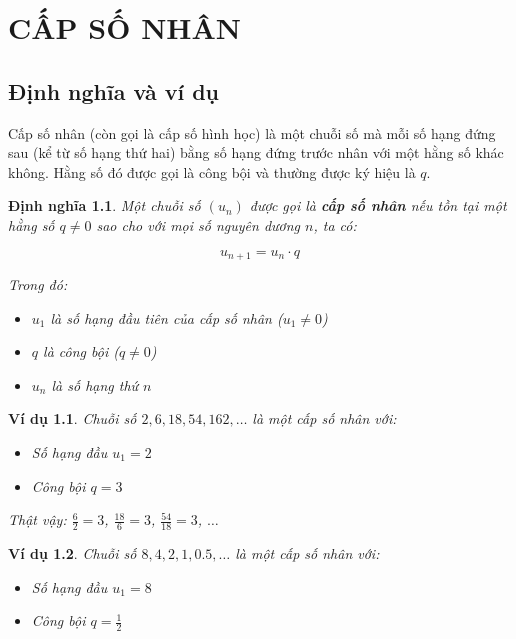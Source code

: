 \documentclass[12pt,a4paper]{report}
\newtheorem{definition}{Định nghĩa}[section]
\newtheorem{example}{Ví dụ}[section]
\begin{document}

\chapter{CẤP SỐ NHÂN}

\section{Định nghĩa và ví dụ}

Cấp số nhân (còn gọi là cấp số hình học) là một chuỗi số mà mỗi số hạng đứng sau (kể từ số hạng thứ hai) bằng số hạng đứng trước nhân với một hằng số khác không. Hằng số đó được gọi là công bội và thường được ký hiệu là $q$.

\begin{definition}
    Một chuỗi số $(u_n)$ được gọi là \textbf{cấp số nhân} nếu tồn tại một hằng số $q \neq 0$ sao cho với mọi số nguyên dương $n$, ta có:
    
    \[
        u_{n+1} = u_n \cdot q
    \]
    
    Trong đó:
    \begin{itemize}[label=\textbullet]
        \item $u_1$ là số hạng đầu tiên của cấp số nhân ($u_1 \neq 0$)
        \item $q$ là công bội ($q \neq 0$)
        \item $u_n$ là số hạng thứ $n$
    \end{itemize}
\end{definition}

\begin{example}
    Chuỗi số $2, 6, 18, 54, 162, \dots$ là một cấp số nhân với:
    
    \begin{itemize}[label=\textbullet]
        \item Số hạng đầu $u_1 = 2$
        \item Công bội $q = 3$
    \end{itemize}
    
    Thật vậy:
    $\frac{6}{2} = 3$,
    $\frac{18}{6} = 3$,
    $\frac{54}{18} = 3$,
    $\dots$
\end{example}

\begin{example}
    Chuỗi số $8, 4, 2, 1, 0.5, \dots$ là một cấp số nhân với:
    
    \begin{itemize}[label=\textbullet]
        \item Số hạng đầu $u_1 = 8$
        \item Công bội $q = \frac{1}{2}$
    \end{itemize}
\end{example}
\end{document}
